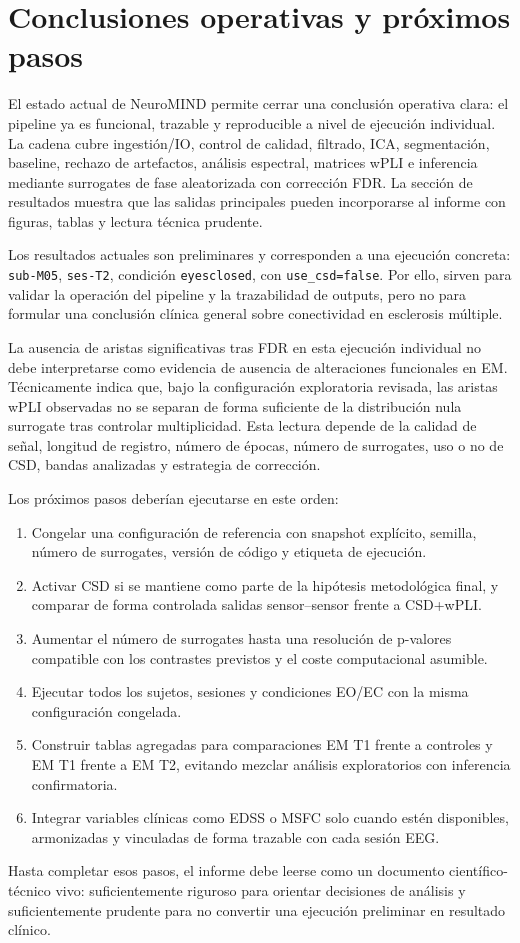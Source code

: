 \section{Conclusiones operativas y próximos pasos}

El estado actual de NeuroMIND permite cerrar una conclusión operativa clara: el pipeline ya es funcional, trazable y reproducible a nivel de ejecución individual. La cadena cubre ingestión/IO, control de calidad, filtrado, ICA, segmentación, baseline, rechazo de artefactos, análisis espectral, matrices wPLI e inferencia mediante surrogates de fase aleatorizada con corrección FDR. La sección de resultados muestra que las salidas principales pueden incorporarse al informe con figuras, tablas y lectura técnica prudente.

\begin{ideaclave}
\small
Los resultados actuales son preliminares y corresponden a una ejecución concreta: \texttt{sub-M05}, \texttt{ses-T2}, condición \texttt{eyesclosed}, con \texttt{use\_csd=false}. Por ello, sirven para validar la operación del pipeline y la trazabilidad de outputs, pero no para formular una conclusión clínica general sobre conectividad en esclerosis múltiple.
\end{ideaclave}

La ausencia de aristas significativas tras FDR en esta ejecución individual no debe interpretarse como evidencia de ausencia de alteraciones funcionales en EM. Técnicamente indica que, bajo la configuración exploratoria revisada, las aristas wPLI observadas no se separan de forma suficiente de la distribución nula surrogate tras controlar multiplicidad. Esta lectura depende de la calidad de señal, longitud de registro, número de épocas, número de surrogates, uso o no de CSD, bandas analizadas y estrategia de corrección.

Los próximos pasos deberían ejecutarse en este orden:

\begin{enumerate}[leftmargin=*]
\item Congelar una configuración de referencia con snapshot explícito, semilla, número de surrogates, versión de código y etiqueta de ejecución.
\item Activar CSD si se mantiene como parte de la hipótesis metodológica final, y comparar de forma controlada salidas sensor--sensor frente a CSD+wPLI.
\item Aumentar el número de surrogates hasta una resolución de p-valores compatible con los contrastes previstos y el coste computacional asumible.
\item Ejecutar todos los sujetos, sesiones y condiciones EO/EC con la misma configuración congelada.
\item Construir tablas agregadas para comparaciones EM T1 frente a controles y EM T1 frente a EM T2, evitando mezclar análisis exploratorios con inferencia confirmatoria.
\item Integrar variables clínicas como EDSS o MSFC solo cuando estén disponibles, armonizadas y vinculadas de forma trazable con cada sesión EEG.
\end{enumerate}

Hasta completar esos pasos, el informe debe leerse como un documento científico-técnico vivo: suficientemente riguroso para orientar decisiones de análisis y suficientemente prudente para no convertir una ejecución preliminar en resultado clínico.
